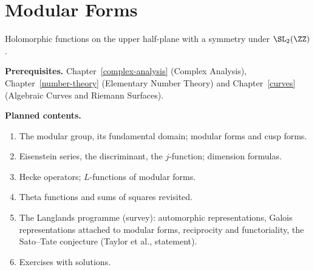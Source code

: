 \chapter{Modular Forms}\label{modular-forms}

Holomorphic functions on the upper half-plane with a symmetry under $\SL_2(\ZZ)$.

\noindent\textbf{Prerequisites.} Chapter~\ref{complex-analysis} (Complex Analysis), Chapter~\ref{number-theory} (Elementary Number Theory) and Chapter~\ref{curves} (Algebraic Curves and Riemann Surfaces).

\noindent\textbf{Planned contents.}
\begin{enumerate}
\item The modular group, its fundamental domain; modular forms and cusp forms.
\item Eisenstein series, the discriminant, the $j$-function; dimension formulas.
\item Hecke operators; $L$-functions of modular forms.
\item Theta functions and sums of squares revisited.
\item The Langlands programme (survey): automorphic representations, Galois representations attached to modular forms, reciprocity and functoriality, the Sato--Tate conjecture (Taylor et al., statement).
\item Exercises with solutions.
\end{enumerate}
